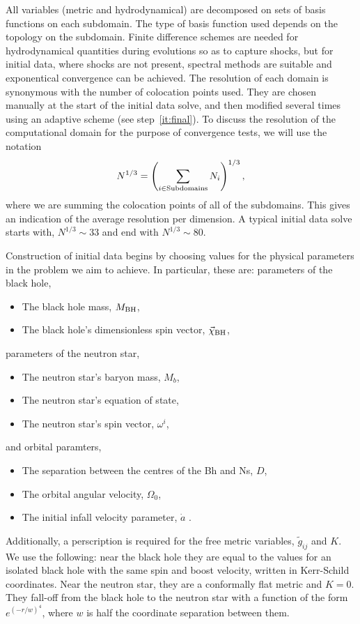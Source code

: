All variables (metric and hydrodynamical) are decomposed on sets of
basis functions on each subdomain. The type of basis function used
depends on the topology on the subdomain. Finite difference schemes are
needed for hydrodynamical quantities during evolutions so as to
capture shocks, but for initial data, where shocks are not present,
spectral methods are suitable and exponentical convergence can be
achieved. The resolution of each domain is synonymous with the
number of colocation points used. They are chosen manually at the
start of the initial data solve, and then modified several times using
an adaptive scheme (see step~\ref{it:final}).  To discuss the resolution of the computational domain for the purpose of convergence tests, we will use the notation
\begin{equation}
N^{1/3}=\left(\sum_{i\in{\rm Subdomains}} N_i\right)^{1/3},
\end{equation}
where we are summing the colocation points of all of the
subdomains. This gives an indication of the average resolution per
dimension. A typical initial data solve starts with, $N^{1/3}\sim 33$ and end with $N^{1/3}\sim 80$.

Construction of initial data begins by choosing values for the
physical parameters in the problem we aim to achieve. In particular,
these are: parameters of the black hole,
\begin{itemize}
\item The black hole mass, $M_{\rm BH}$,
\item The black hole's dimensionless spin vector,
  $\vec{\chi}_{\rm BH}$,
\end{itemize}
parameters of the neutron star,
\begin{itemize}
\item The neutron star's baryon mass, $M_{b}$,
\item The neutron star's equation of state, 
\item The neutron star's spin vector, $\omega^i$,
\end{itemize}
and orbital paramters,
\begin{itemize}
\item The separation between the centres of the Bh and Ns, $D$,
\item The orbital angular velocity, $\Omega_0$,
\item The initial infall velocity parameter, $\dot{a}$
.
\end{itemize}
Additionally,  a perscription is required for the free
metric variables, $\tilde{g}_{ij}$ and $K$. We use the following: near the black hole they
are equal to the values for an isolated black hole with the same spin and boost
velocity,
written in Kerr-Schild coordinates. Near the neutron star, they are a
conformally flat metric and $K=0$. They fall-off from the black hole
to the neutron star with a function of the form $e^{(-r/w)^4}$, where
$w$ is half the coordinate separation between them.

